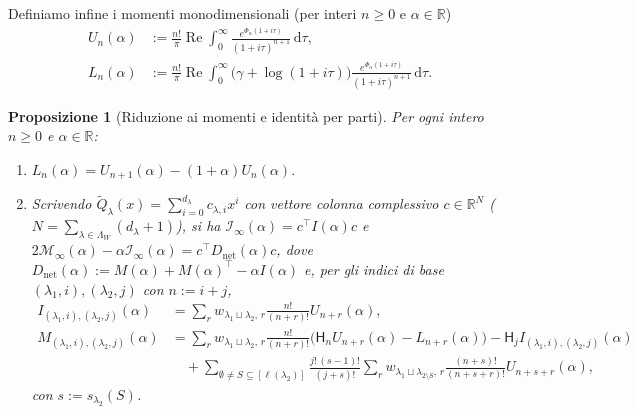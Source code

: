 \documentclass[11pt, reqno]{amsart}
\newtheorem{proposition}[lemma]{Proposizione}
\theoremstyle{remark}
\numberwithin{equation}{section}
\DeclareMathOperator{\re}{Re}
\newcommand{\Harm}{\mathsf{H}}
\newcommand{\R}{\mathbb{R}}
\newcommand{\dd}{\,\mathrm{d}}
\begin{document}
Definiamo infine i momenti monodimensionali (per interi $n \ge 0$ e $\alpha \in \R$)
\begin{align}
U_n(\alpha) &:= \frac{n!}{\pi}\re \int_0^\infty \frac{e^{\Phi_\alpha(1+i\tau)}}{(1+i\tau)^{n+1}}\dd\tau, \nonumber\\
L_n(\alpha) &:= \frac{n!}{\pi}\re \int_0^\infty \bigl(\gamma + \log(1+i\tau)\bigr)\frac{e^{\Phi_\alpha(1+i\tau)}}{(1+i\tau)^{n+1}}\dd\tau. \label{eq:Un-Ln-def}
\end{align}

\begin{proposition}[Riduzione ai momenti e identità per parti]\label{prop:UL-reduction}
Per ogni intero $n \ge 0$ e $\alpha \in \R$:
\begin{enumerate}
\item[(i)] $L_n(\alpha) = U_{n+1}(\alpha) - (1+\alpha) U_n(\alpha)$.
\item[(ii)] Scrivendo $\widetilde{Q}_\lambda(x) = \sum_{i=0}^{d_\lambda} c_{\lambda, i} x^i$ con vettore
colonna complessivo $c \in \R^N$ ($N = \sum_{\lambda\in\Lambda_W}(d_\lambda + 1)$), si ha
$\mathcal{I}_\infty(\alpha) = c^\top I(\alpha) c$ e
$2\mathcal{M}_\infty(\alpha) - \alpha \mathcal{I}_\infty(\alpha) = c^\top D_{\mathrm{net}}(\alpha) c$,
dove $D_{\mathrm{net}}(\alpha) := M(\alpha) + M(\alpha)^\top - \alpha I(\alpha)$ e, per gli indici di
base $(\lambda_1, i), (\lambda_2, j)$ con $n := i+j$,
\begin{align}
I_{(\lambda_1,i),(\lambda_2,j)}(\alpha)
&= \sum_r w_{\lambda_1\sqcup\lambda_2,\, r} \frac{n!}{(n+r)!} U_{n+r}(\alpha), \label{eq:I-entry}\\
M_{(\lambda_1,i),(\lambda_2,j)}(\alpha)
&= \sum_r w_{\lambda_1\sqcup\lambda_2,\, r} \frac{n!}{(n+r)!}
\bigl(\Harm_n U_{n+r}(\alpha) - L_{n+r}(\alpha)\bigr)
- \Harm_j I_{(\lambda_1,i),(\lambda_2,j)}(\alpha) \nonumber\\
&\quad + \sum_{\emptyset \neq S \subseteq [\ell(\lambda_2)]}
\frac{j!\,(s-1)!}{(j+s)!}
\sum_r w_{\lambda_1\sqcup\lambda_{2\setminus S},\, r}
\frac{(n+s)!}{(n+s+r)!} U_{n+s+r}(\alpha), \label{eq:M-entry}
\end{align}
con $s := s_{\lambda_2}(S)$.
\end{enumerate}
\end{proposition}
\end{document}

